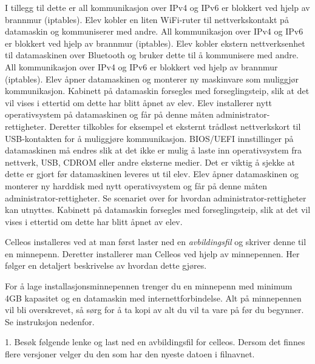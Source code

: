 I tillegg til dette er all kommunikasjon over IPv4 og IPv6 er blokkert ved hjelp av brannmur (iptables).
Elev kobler en liten WiFi-ruter til nettverkskontakt p\aa{} datamaskin og kommuniserer med andre.	All kommunikasjon over IPv4 og IPv6 er blokkert ved hjelp av brannmur (iptables).
Elev kobler ekstern nettverksenhet til datamaskinen over Bluetooth og bruker dette til \aa{} kommunisere med andre.	All kommunikasjon over IPv4 og IPv6 er blokkert ved hjelp av brannmur (iptables).
Elev \aa pner datamaskinen og monterer ny maskinvare som muliggj\o r kommunikasjon.	Kabinett p\aa{} datamaskin forsegles med forseglingsteip, slik at det vil vises i ettertid om dette har blitt \aa pnet av elev.
Elev installerer nytt operativsystem p\aa{} datamaskinen og f\aa r p\aa{} denne m\aa ten administrator-rettigheter. Deretter tilkobles for eksempel et eksternt tr\aa dl\o st nettverkskort til USB-kontakten for \aa{} muliggj\o re kommunikasjon.	BIOS/UEFI innstillinger p\aa{} datamaskinen m\aa{} endres slik at det ikke er mulig \aa{} laste inn operativsystem fra nettverk, USB, CDROM eller andre eksterne medier. Det er viktig \aa{} sjekke at dette er gjort f\o r datamaskinen leveres ut til elev.
Elev \aa pner datamaskinen og monterer ny harddisk med nytt operativsystem og f\aa r p\aa{} denne m\aa ten administrator-rettigheter. Se scenariet over for hvordan administrator-rettigheter kan utnyttes.	Kabinett p\aa{} datamaskin forsegles med forseglingsteip, slik at det vil vises i ettertid om dette har blitt \aa pnet av elev.




Celleos installeres ved at man f\o rst laster ned en {\it avbildingsfil} og skriver denne til en minnepenn. Deretter installerer man Celleos ved hjelp av minnepennen. Her f\o lger en detaljert beskrivelse av hvordan dette gj\o res.


For \aa{} lage installasjonsminnepennen trenger du en minnepenn med minimum 4GB kapasitet og en datamaskin med internettforbindelse. Alt p\aa{} minnepennen vil bli overskrevet, s\aa{} s\o rg for \aa{} ta kopi av alt du vil ta vare p\aa{} f\o r du begynner. Se instruksjon nedenfor.
\item{1.} Bes\o k f\o lgende lenke og last ned en avbildingsfil for celleos. Dersom det finnes flere versjoner velger du den som har den nyeste datoen i filnavnet.

